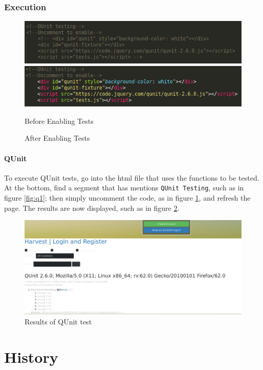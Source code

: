 \documentclass[12pt]{article}
\begin{document}
\subsubsection{Execution}
\begin{figure}[ht!]
            \includegraphics[width=.5\textwidth]{images/q1.png}
            \includegraphics[width=.5\textwidth]{images/q2.png}
            \caption{Before Enabling Tests}
            \label{fig:q1}
            \caption{After Enabling Tests}
            \label{fig:q2}
        \end{figure}
\paragraph{QUnit} To execute QUnit tests, go into the html file that uses the functions to be tested. At the bottom, find a segment that has mentions \texttt{QUnit Testing}, such as in figure \ref{fig:q1}; then simply uncomment the code, as in figure \ref{fig:q2}, and refresh the page. The results are now displayed, such as in figure \ref{fig:qr}.

\begin{figure}
\label{fig:qr}
\includegraphics[width=\textwidth]{images/qr.png}
\caption{Results of QUnit test}
\end{figure}

\section{History}
\end{document}
